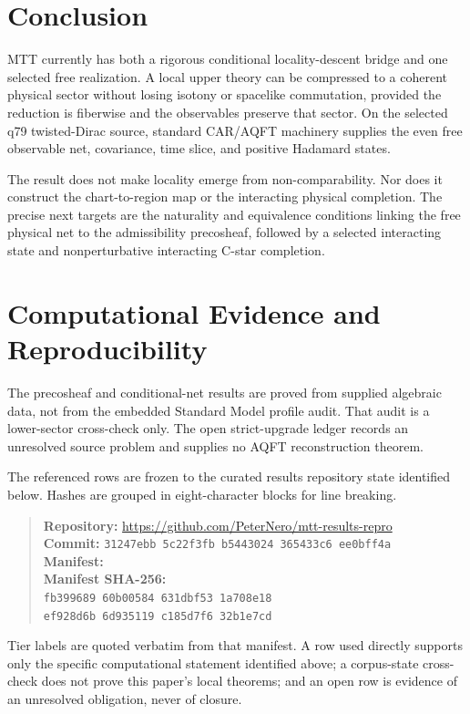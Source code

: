 \documentclass[11pt]{article}
\begin{document}
\section{Conclusion}

MTT currently has both a rigorous conditional locality-descent bridge and one
selected free realization.  A local upper theory can be compressed to a
coherent physical sector without losing isotony or spacelike commutation,
provided the reduction is fiberwise and the observables preserve that sector.
On the selected q79 twisted-Dirac source, standard CAR/AQFT machinery supplies
the even free observable net, covariance, time slice, and positive Hadamard
states.

The result does not make locality emerge from non-comparability.  Nor does it
construct the chart-to-region map or the interacting physical completion.
The precise next targets are the naturality and equivalence conditions linking
the free physical net to the admissibility precosheaf, followed by a selected
interacting state and nonperturbative interacting C-star completion.

\section*{Computational Evidence and Reproducibility}
The precosheaf and conditional-net results are proved from supplied algebraic data, not from the embedded Standard Model profile audit. That audit is a lower-sector cross-check only. The open strict-upgrade ledger records an unresolved source problem and supplies no AQFT reconstruction theorem.

The referenced rows are frozen to the curated results repository state identified below. Hashes are grouped in eight-character blocks for line breaking.
\begin{quote}\small
\textbf{Repository:} \url{https://github.com/PeterNero/mtt-results-repro}\\
\textbf{Commit:} \texttt{31247ebb 5c22f3fb b5443024 365433c6 ee0bff4a}\\
\textbf{Manifest:} \\
\textbf{Manifest SHA-256:}\\
\texttt{fb399689 60b00584 631dbf53 1a708e18}\\
\texttt{ef928d6b 6d935119 c185d7f6 32b1e7cd}
\end{quote}

Tier labels are quoted verbatim from that manifest. A row used directly supports only the specific computational statement identified above; a corpus-state cross-check does not prove this paper's local theorems; and an open row is evidence of an unresolved obligation, never of closure.
\end{document}
